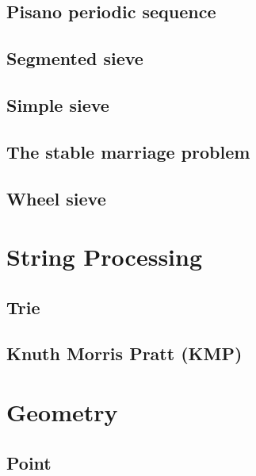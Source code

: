 \subsection{Pisano periodic sequence}
\raggedbottom
\hrulefill
\subsection{Segmented sieve}
\raggedbottom
\hrulefill
\subsection{Simple sieve}
\raggedbottom
\hrulefill
\subsection{The stable marriage problem}
\raggedbottom
\hrulefill
\subsection{Wheel sieve}
\raggedbottom
\hrulefill


\section{String Processing}
\subsection{Trie}
\raggedbottom
\hrulefill
\subsection{Knuth Morris Pratt (KMP)}
\raggedbottom
\hrulefill


\section{Geometry}
\subsection{Point}
\raggedbottom
\hrulefill


